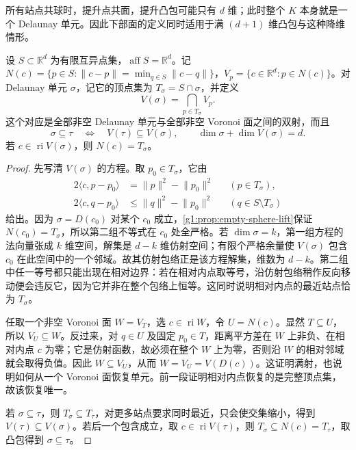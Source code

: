 所有站点共球时，提升点共面，提升凸包可能只有 \(d\) 维；此时整个 \(K\) 本身就是一个 Delaunay 单元。因此下部面的定义同时适用于满 \((d+1)\) 维凸包与这种降维情形。

\begin{theorem}\label{g1:thm:voronoi-delaunay-duality}
	设 \(S\subset\mathbb R^d\) 为有限互异点集，\(\operatorname{aff}S=\mathbb R^d\)。记 \(N(c)=\{p\in S:\lVert c-p\rVert=\min_{q\in S}\lVert c-q\rVert\}\)，\(V_p=\{c\in\mathbb R^d:p\in N(c)\}\)。对 Delaunay 单元 \(\sigma\)，记它的顶点集为 \(T_\sigma=S\cap\sigma\)，并定义
	\[
		V(\sigma)=\bigcap_{p\in T_\sigma}V_p.
	\]
	这个对应是全部非空 Delaunay 单元与全部非空 Voronoi 面之间的双射，而且
	\[
		\sigma\subseteq\tau\quad\Longleftrightarrow\quad
		V(\tau)\subseteq V(\sigma),
		\qquad \dim\sigma+\dim V(\sigma)=d.
	\]
	若 \(c\in\operatorname{ri}V(\sigma)\)，则 \(N(c)=T_\sigma\)。
\end{theorem}
\begin{proof}
	先写清 \(V(\sigma)\) 的方程。取 \(p_0\in T_\sigma\)，它由
	\[
		\begin{aligned}
			2\langle c,p-p_0\rangle&=\lVert p\rVert^2-\lVert p_0\rVert^2
			&& (p\in T_\sigma),\\
			2\langle c,q-p_0\rangle&\le\lVert q\rVert^2-\lVert p_0\rVert^2
			&& (q\in S\setminus T_\sigma)
		\end{aligned}
	\]
	给出。因为 \(\sigma=D(c_0)\) 对某个 \(c_0\) 成立，\cref{g1:prop:empty-sphere-lift}保证 \(N(c_0)=T_\sigma\)，所以第二组不等式在 \(c_0\) 处全严格。若 \(\dim\sigma=k\)，第一组方程的法向量张成 \(k\) 维空间，解集是 \(d-k\) 维仿射空间；有限个严格余量使 \(V(\sigma)\) 包含 \(c_0\) 在此空间中的一个邻域。故其仿射包络正是该方程解集，维数为 \(d-k\)。第二组中任一等号都只能出现在相对边界：若在相对内点取等号，沿仿射包络稍作反向移动便会违反它，因为它并非在整个包络上恒等。这同时说明相对内点的最近站点恰为 \(T_\sigma\)。

	任取一个非空 Voronoi 面 \(W=V_T\)，选 \(c\in\operatorname{ri}W\)，令 \(U=N(c)\)。显然 \(T\subseteq U\)，所以 \(V_U\subseteq W\)。反过来，对 \(q\in U\) 及固定 \(p_0\in T\)，距离平方差在 \(W\) 上非负、在相对内点 \(c\) 为零；它是仿射函数，故必须在整个 \(W\) 上为零，否则沿 \(W\) 的相对邻域就会取得负值。因此 \(W\subseteq V_U\)，从而 \(W=V_U=V(D(c))\)。这证明满射，也说明如何从一个 Voronoi 面恢复单元。前一段证明相对内点恢复的是完整顶点集，故该恢复唯一。

	若 \(\sigma\subseteq\tau\)，则 \(T_\sigma\subseteq T_\tau\)，对更多站点要求同时最近，只会使交集缩小，得到 \(V(\tau)\subseteq V(\sigma)\)。若后一个包含成立，取 \(c\in\operatorname{ri}V(\tau)\)，则 \(T_\sigma\subseteq N(c)=T_\tau\)，取凸包得到 \(\sigma\subseteq\tau\)。
\end{proof}

